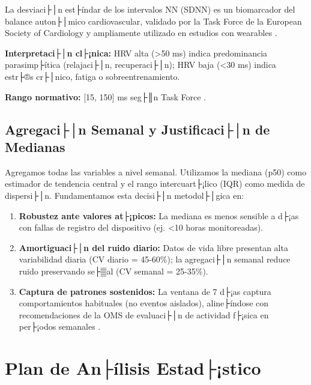 La desviaci├│n est├índar de los intervalos NN (SDNN) es un biomarcador del balance auton├│mico cardiovascular, validado por la Task Force de la European Society of Cardiology \cite{TaskForce1996} y ampliamente utilizado en estudios con wearables \cite{Laborde2017}.

\textbf{Interpretaci├│n cl├¡nica:} HRV alta (>50 ms) indica predominancia parasimp├ítica (relajaci├│n, recuperaci├│n); HRV baja (<30 ms) indica estr├®s cr├│nico, fatiga o sobreentrenamiento.

\textbf{Rango normativo:} [15, 150] ms seg├║n Task Force \cite{TaskForce1996}.

\subsection{Agregaci├│n Semanal y Justificaci├│n de Medianas}
\label{subsec:agregacion_semanal}

Agregamos todas las variables a nivel semanal. Utilizamos la mediana (p50) como estimador de tendencia central y el rango intercuart├¡lico (IQR) como medida de dispersi├│n. Fundamentamos esta decisi├│n metodol├│gica en:

\begin{enumerate}
    \item \textbf{Robustez ante valores at├¡picos:} La mediana es menos sensible a d├¡as con fallas de registro del dispositivo (ej. <10 horas monitoreadas).
    
    \item \textbf{Amortiguaci├│n del ruido diario:} Datos de vida libre presentan alta variabilidad diaria (CV diario = 45-60\%); la agregaci├│n semanal reduce ruido preservando se├▒al (CV semanal = 25-35\%).
    
    \item \textbf{Captura de patrones sostenidos:} La ventana de 7 d├¡as captura comportamientos habituales (no eventos aislados), aline├índose con recomendaciones de la OMS de evaluaci├│n de actividad f├¡sica en per├¡odos semanales \cite{WHO2020}.
\end{enumerate}

\section{Plan de An├ílisis Estad├¡stico}
\label{sec:plan_analisis_estadistico}


